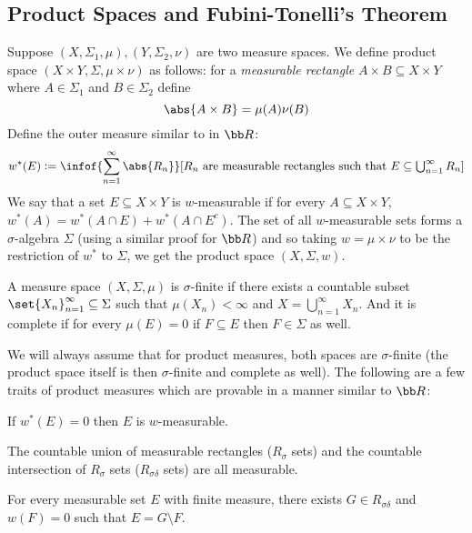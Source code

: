 \subsection{Product Spaces and Fubini-Tonelli's Theorem}

\bdefn

    Suppose $(X,\Sigma_1,\mu),(Y,\Sigma_2,\nu)$ are two measure spaces.
    We define {\emphcolor product space} $(X\times Y,\Sigma,\mu\times\nu)$ as follows: for a {\it measurable rectangle} $A\times B\subseteq X\times Y$ where $A\in\Sigma_1$ and $B\in\Sigma_2$ define
    $$ \abs{A\times B} = \mu(A)\nu(B) $$
    Define the outer measure similar to in ${\bb R}$:
    $$ w^*(E) \coloneqq \infof{\sum_{n=1}^\infty\abs{R_n}}[\hbox{$R_n$ are measurable rectangles such that $E\subseteq\bigcup_{n=1}^\infty R_n$}] $$
    We say that a set $E\subseteq X\times Y$ is {\emphcolor $w$-measurable} if for every $A\subseteq X\times Y$, $w^*(A)=w^*(A\cap E)+w^*(A\cap E^c)$.
    The set of all $w$-measurable sets forms a $\sigma$-algebra $\Sigma$ (using a similar proof for ${\bb R}$) and so taking $w=\mu\times\nu$ to be the restriction of $w^*$ to $\Sigma$, we get the
    product space $(X,\Sigma,w)$.

\edefn

\bdefn

    A measure space $(X,\Sigma,\mu)$ is {\emphcolor $\sigma$-finite} if there exists a countable subset $\set{X_n}_{n=1}^\infty\subseteq\Sigma$ such that $\mu(X_n)<\infty$ and $X=\bigcup_{n=1}^\infty X_n$.
    And it is {\emphcolor complete} if for every $\mu(E)=0$ if $F\subseteq E$ then $F\in\Sigma$ as well.

\edefn

We will always assume that for product measures, both spaces are $\sigma$-finite (the product space itself is then $\sigma$-finite and complete as well).
The following are a few traits of product measures which are provable in a manner similar to ${\bb R}$:
\benum
    \item If $w^*(E)=0$ then $E$ is $w$-measurable.
    \item The countable union of measurable rectangles ($R_\sigma$ sets) and the countable intersection of $R_\sigma$ sets ($R_{\sigma\delta}$ sets) are all measurable.
    \item For every measurable set $E$ with finite measure, there exists $G\in R_{\sigma\delta}$ and $w(F)=0$ such that $E=G\setminus F$.
\eenum

\bthrm[title=Fubini's Theorem, name=fubini]

